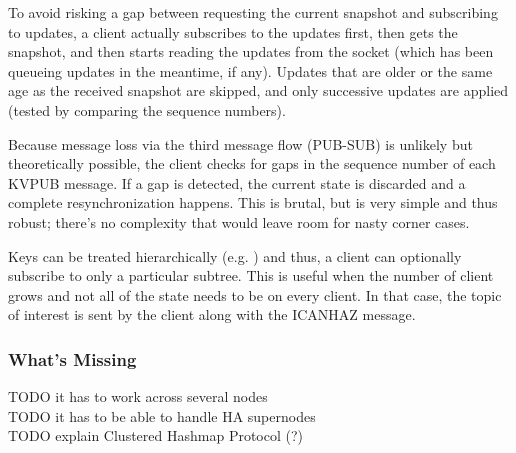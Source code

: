 To avoid risking a gap between requesting the current snapshot and subscribing
to updates, a client actually subscribes to the updates first, then gets the
snapshot, and then starts reading the updates from the socket (which has been
queueing updates in the meantime, if any). Updates that are older or the same
age as the received snapshot are skipped, and only successive updates are
applied (tested by comparing the sequence numbers).

Because message loss via the third message flow (PUB-SUB) is unlikely but
theoretically possible, the client checks for gaps in the sequence number of
each KVPUB message. If a gap is detected, the current state is discarded and a
complete resynchronization happens. This is brutal, but is very simple and thus
robust; there's no complexity that would leave room for nasty corner cases.

Keys can be treated hierarchically (e.g. ) and thus, a
client can optionally subscribe to only a particular subtree. This is useful
when the number of client grows and not all of the state needs to be on every
client. In that case, the topic of interest is sent by the client along with
the ICANHAZ message.

\subsubsection{What's Missing}
TODO it has to work across several nodes\\
TODO it has to be able to handle HA supernodes\\
TODO explain Clustered Hashmap Protocol (?)\\

